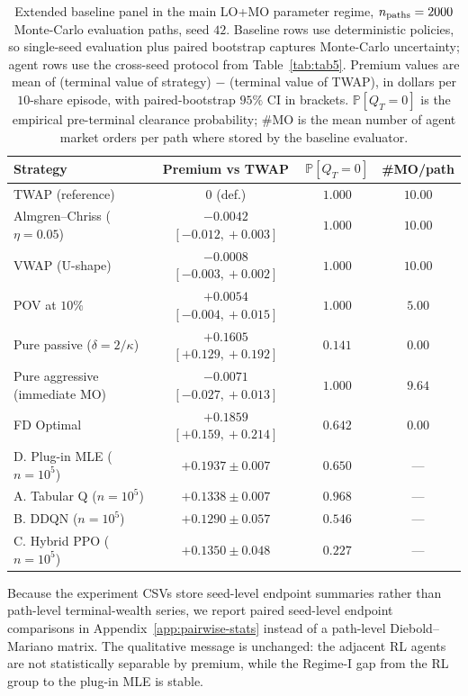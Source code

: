 \documentclass[]{interact}
\theoremstyle{plain}
\theoremstyle{definition}
\theoremstyle{remark}
\newcommand{\1}[1]{\mathbf{1}_{\{#1\}}}
\begin{document}
\begin{table}[t]
\centering
\caption{Extended baseline panel in the main LO+MO parameter regime, $n_{\rm paths} = 2000$ Monte-Carlo evaluation paths, seed $42$. Baseline rows use deterministic policies, so single-seed evaluation plus paired bootstrap captures Monte-Carlo uncertainty; agent rows use the cross-seed protocol from Table~\ref{tab:tab5}. Premium values are mean of (terminal value of strategy) $-$ (terminal value of TWAP), in dollars per $10$-share episode, with paired-bootstrap $95\%$ CI in brackets. $\mathbb{P}[Q_T = 0]$ is the empirical pre-terminal clearance probability; \#MO is the mean number of agent market orders per path where stored by the baseline evaluator.}
\label{tab:tab4}
\begin{tabular}{@{}lccc@{}}
\toprule
Strategy & Premium vs TWAP & $\mathbb{P}[Q_T = 0]$ & \#MO/path \\
\midrule
TWAP (reference)              & $0$ (def.)               & $1.000$ & $10.00$ \\
Almgren--Chriss ($\eta=0.05$) & $-0.0042$ $[-0.012,\!+0.003]$ & $1.000$ & $10.00$ \\
VWAP (U-shape)                & $-0.0008$ $[-0.003,\!+0.002]$ & $1.000$ & $10.00$ \\
POV at $10\%$                 & $+0.0054$ $[-0.004,\!+0.015]$ & $1.000$ & $5.00$ \\
Pure passive ($\delta = 2/\kappa$) & $+0.1605$ $[+0.129,\!+0.192]$ & $0.141$ & $0.00$ \\
Pure aggressive (immediate MO)& $-0.0071$ $[-0.027,\!+0.013]$ & $1.000$ & $9.64$ \\
\midrule
FD Optimal                    & $+0.1859$ $[+0.159,\!+0.214]$ & $0.642$ & $0.00$ \\
D. Plug-in MLE ($n = 10^5$)   & $+0.1937 \pm 0.007$         & $0.650$ & --- \\
\midrule
A. Tabular Q ($n = 10^5$)     & $+0.1338 \pm 0.007$         & $0.968$ & --- \\
B. DDQN ($n = 10^5$)          & $+0.1290 \pm 0.057$         & $0.546$ & --- \\
C. Hybrid PPO ($n = 10^5$)    & $+0.1350 \pm 0.048$         & $0.227$ & --- \\
\bottomrule
\end{tabular}
\end{table}

Because the experiment CSVs store seed-level endpoint summaries rather than path-level terminal-wealth series, we report paired seed-level endpoint comparisons in Appendix~\ref{app:pairwise-stats} instead of a path-level Diebold--Mariano matrix. The qualitative message is unchanged: the adjacent RL agents are not statistically separable by premium, while the Regime-I gap from the RL group to the plug-in MLE is stable.
\end{document}
